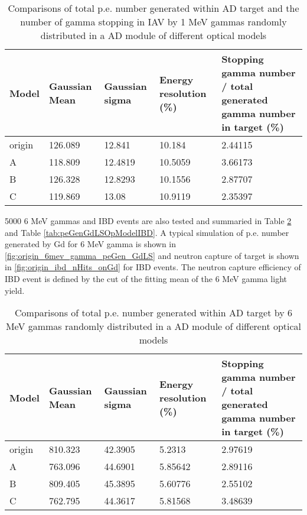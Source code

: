 \begin{table}
\centering
\caption{Comparisons of total p.e. number generated within AD target
and the number of gamma stopping in IAV by 1 MeV gammas randomly distributed 
in a AD module of different optical models}
\label{tab:peGenGdLSOpModel}
\begin{tabular}{lp{1.5cm}p{1.5cm}p{2.0cm}p{6.5cm}}
Model  &  Gaussian Mean  &  Gaussian sigma &     Energy resolution (\%) & Stopping gamma number / total generated gamma number in target (\%) \\
\hline
\hline
origin  & 126.089 & 12.841 & 10.184 & 2.44115\\
A       & 118.809 & 12.4819 & 10.5059 & 3.66173\\
B       & 126.328 & 12.8293 & 10.1556 & 2.87707\\
C       & 119.869 & 13.08 & 10.9119 & 2.35397 \\
\hline
\end{tabular}
\end{table}


5000 6 MeV gammas and IBD events are also tested and summaried in Table \ref{tab:peGenGdLSOpModel6mevGamma} and Table \ref{tab:peGenGdLSOpModelIBD}.
A typical simulation of p.e. number generated by Gd for 6 MeV gamma is shown in \ref{fig:origin_6mev_gamma_peGen_GdLS} and
neutron capture of target is shown in \ref{fig:origin_ibd_nHits_onGd} for IBD events.
The neutron capture efficiency of IBD event is defined by the cut of the fitting mean of the 6 MeV gamma light yield.

\begin{table}
\centering
\caption{Comparisons of total p.e. number generated within AD target by 6 MeV gammas randomly distributed
in a AD module of different optical models}
\label{tab:peGenGdLSOpModel6mevGamma}
\begin{tabular}{lp{1.5cm}p{1.5cm}p{2.0cm}p{6.5cm}}
Model  &  Gaussian Mean  &  Gaussian sigma &     Energy resolution (\%) & Stopping gamma number / total generated gamma number in target (\%) \\
\hline
\hline
origin  & 810.323 & 42.3905 & 5.2313 & 2.97619 \\
A       & 763.096 & 44.6901 & 5.85642 & 2.89116 \\
B       & 809.405 & 45.3895 & 5.60776 & 2.55102 \\
C       & 762.795 & 44.3617 & 5.81568 & 3.48639 \\
\hline
\end{tabular}
\end{table}


